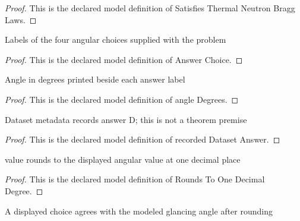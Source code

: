 \begin{proof}
  This is the declared model definition of Satisfies Thermal Neutron Bragg Laws.
\end{proof}
\begin{definition}
  \label{def:physics:phyx-mini-0557:phyxminiproblems-problemphyxmini0557-answerchoice}
  Labels of the four angular choices supplied with the problem
\end{definition}
\begin{proof}
  This is the declared model definition of Answer Choice.
\end{proof}
\begin{definition}
  \label{def:physics:phyx-mini-0557:phyxminiproblems-problemphyxmini0557-answerchoice-angledegrees}
  Angle in degrees printed beside each answer label
\end{definition}
\begin{proof}
  This is the declared model definition of angle Degrees.
\end{proof}
\begin{definition}
  \label{def:physics:phyx-mini-0557:phyxminiproblems-problemphyxmini0557-recordeddatasetanswer}
  Dataset metadata records answer D; this is not a theorem premise
\end{definition}
\begin{proof}
  This is the declared model definition of recorded Dataset Answer.
\end{proof}
\begin{definition}
  \label{def:physics:phyx-mini-0557:phyxminiproblems-problemphyxmini0557-roundstoonedecimaldegree}
  value rounds to the displayed angular value at one decimal place
\end{definition}
\begin{proof}
  This is the declared model definition of Rounds To One Decimal Degree.
\end{proof}
\begin{definition}
  \label{def:physics:phyx-mini-0557:phyxminiproblems-problemphyxmini0557-matchesdisplayedbraggangle}
  A displayed choice agrees with the modeled glancing angle after rounding
\end{definition}
